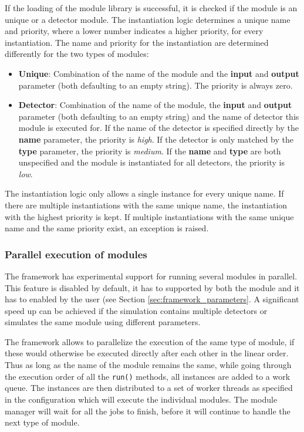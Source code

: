 If the loading of the module library is successful, it is checked if the module is an unique or a detector module.
The instantiation logic determines a unique name and priority, where a lower number indicates a higher priority, for every instantiation.
The name and priority for the instantiation are determined differently for the two types of modules:
\begin{itemize}
\item \textbf{Unique}: Combination of the name of the module and the \textbf{input} and \textbf{output} parameter (both defaulting to an empty string).
The priority is always zero.
\item \textbf{Detector}: Combination of the name of the module, the \textbf{input} and \textbf{output} parameter (both defaulting to an empty string) and the name of detector this module is executed for.
If the name of the detector is specified directly by the \textbf{name} parameter, the priority is \emph{high}.
If the detector is only matched by the \textbf{type} parameter, the priority is \emph{medium}.
If the \textbf{name} and \textbf{type} are both unspecified and the module is instantiated for all detectors, the priority is \emph{low}.
\end{itemize}
The instantiation logic only allows a single instance for every unique name.
If there are multiple instantiations with the same unique name, the instantiation with the highest priority is kept.
If multiple instantiations with the same unique name and the same priority exist, an exception is raised.

\subsubsection{Parallel execution of modules}
\label{sec:multithreading}
The framework has experimental support for running several modules in parallel. This feature is disabled by default, it has to supported by both the module and it has to enabled by the user (see Section \ref{sec:framework_parameters}.  A significant speed up can be achieved if the simulation contains multiple detectors or simulates the same module using different parameters.

The framework allows to parallelize the execution of the same type of module, if these would otherwise be executed directly after each other in the linear order. 
Thus as long as the name of the module remains the same, while going through the execution order of all the \texttt{run()} methods, all instances are added to a work queue. 
The instances are then distributed to a set of worker threads as specified in the configuration which will execute the individual modules.
The module manager will wait for all the jobs to finish, before it will continue to handle the next type of module.

